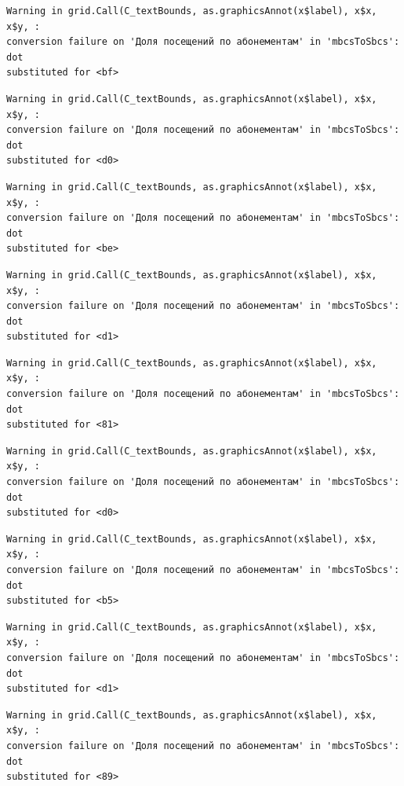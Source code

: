 \documentclass[
  letterpaper,
  DIV=11,
  numbers=noendperiod]{scrartcl}
\begin{document}
\begin{verbatim}
Warning in grid.Call(C_textBounds, as.graphicsAnnot(x$label), x$x, x$y, :
conversion failure on 'Доля посещений по абонементам' in 'mbcsToSbcs': dot
substituted for <bf>
\end{verbatim}

\begin{verbatim}
Warning in grid.Call(C_textBounds, as.graphicsAnnot(x$label), x$x, x$y, :
conversion failure on 'Доля посещений по абонементам' in 'mbcsToSbcs': dot
substituted for <d0>
\end{verbatim}

\begin{verbatim}
Warning in grid.Call(C_textBounds, as.graphicsAnnot(x$label), x$x, x$y, :
conversion failure on 'Доля посещений по абонементам' in 'mbcsToSbcs': dot
substituted for <be>
\end{verbatim}

\begin{verbatim}
Warning in grid.Call(C_textBounds, as.graphicsAnnot(x$label), x$x, x$y, :
conversion failure on 'Доля посещений по абонементам' in 'mbcsToSbcs': dot
substituted for <d1>
\end{verbatim}

\begin{verbatim}
Warning in grid.Call(C_textBounds, as.graphicsAnnot(x$label), x$x, x$y, :
conversion failure on 'Доля посещений по абонементам' in 'mbcsToSbcs': dot
substituted for <81>
\end{verbatim}

\begin{verbatim}
Warning in grid.Call(C_textBounds, as.graphicsAnnot(x$label), x$x, x$y, :
conversion failure on 'Доля посещений по абонементам' in 'mbcsToSbcs': dot
substituted for <d0>
\end{verbatim}

\begin{verbatim}
Warning in grid.Call(C_textBounds, as.graphicsAnnot(x$label), x$x, x$y, :
conversion failure on 'Доля посещений по абонементам' in 'mbcsToSbcs': dot
substituted for <b5>
\end{verbatim}

\begin{verbatim}
Warning in grid.Call(C_textBounds, as.graphicsAnnot(x$label), x$x, x$y, :
conversion failure on 'Доля посещений по абонементам' in 'mbcsToSbcs': dot
substituted for <d1>
\end{verbatim}

\begin{verbatim}
Warning in grid.Call(C_textBounds, as.graphicsAnnot(x$label), x$x, x$y, :
conversion failure on 'Доля посещений по абонементам' in 'mbcsToSbcs': dot
substituted for <89>
\end{verbatim}
\end{document}
